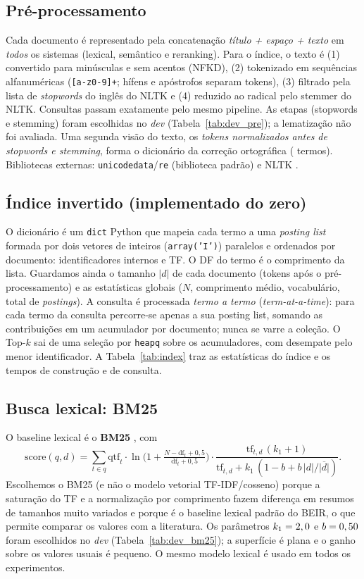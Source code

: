 \subsection{Pré-processamento}
Cada documento é representado pela concatenação \emph{título + espaço + texto} em \emph{todos} os sistemas (lexical, semântico e reranking). Para o índice, o texto é (1) convertido para minúsculas e sem acentos (NFKD), (2) tokenizado em sequências alfanuméricas (\texttt{[a-z0-9]+}; hífens e apóstrofos separam tokens), (3) filtrado pela lista de \emph{stopwords} do inglês do NLTK \cite{bird2009nltk} e (4) reduzido ao radical pelo stemmer \PreStem{} do NLTK. Consultas passam exatamente pelo mesmo pipeline. As etapas (stopwords e stemming) foram escolhidas no \emph{dev} (Tabela~\ref{tab:dev_pre}); a lematização não foi avaliada. Uma segunda visão do texto, os \emph{tokens normalizados antes de stopwords e stemming}, forma o dicionário da correção ortográfica (\DictSize{} termos). Bibliotecas externas: \texttt{unicodedata}/\texttt{re} (biblioteca padrão) e NLTK \NltkVer{}.

\subsection{Índice invertido (implementado do zero)}
O dicionário é um \texttt{dict} Python que mapeia cada termo a uma \emph{posting list} formada por dois vetores de inteiros (\texttt{array('I')}) paralelos e ordenados por documento: identificadores internos e TF. O DF do termo é o comprimento da lista. Guardamos ainda o tamanho $|d|$ de cada documento (tokens após o pré-processamento) e as estatísticas globais ($N$, comprimento médio, vocabulário, total de \emph{postings}). A consulta é processada \emph{termo a termo} (\emph{term-at-a-time}): para cada termo da consulta percorre-se apenas a sua posting list, somando as contribuições em um acumulador por documento; nunca se varre a coleção. O Top-$k$ sai de uma seleção por \texttt{heapq} sobre os acumuladores, com desempate pelo menor identificador. A Tabela~\ref{tab:index} traz as estatísticas do índice e os tempos de construção e de consulta.



\subsection{Busca lexical: BM25}
O baseline lexical é o \textbf{BM25} \cite{robertson2009bm25}, com
\[
\mathrm{score}(q,d)=\sum_{t\in q}\mathrm{qtf}_t\cdot \ln\!\Big(1+\tfrac{N-\mathrm{df}_t+0{,}5}{\mathrm{df}_t+0{,}5}\Big)\cdot\frac{\mathrm{tf}_{t,d}\,(k_1+1)}{\mathrm{tf}_{t,d}+k_1\,(1-b+b\,|d|/\overline{|d|})}.
\]
Escolhemos o BM25 (e não o modelo vetorial TF-IDF/cosseno) porque a saturação do TF e a normalização por comprimento fazem diferença em resumos de tamanhos muito variados e porque é o baseline lexical padrão do BEIR, o que permite comparar os valores com a literatura. Os parâmetros $k_1=2,0$ e $b=0,50$ foram escolhidos no \emph{dev} (Tabela~\ref{tab:dev_bm25}); a superfície é plana e o ganho sobre os valores usuais é pequeno. O mesmo modelo lexical é usado em todos os experimentos.

